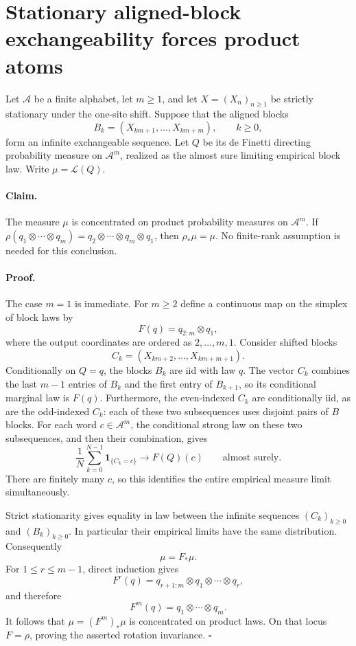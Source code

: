 \section*{Stationary aligned-block exchangeability forces product atoms}

Let $\mathcal A$ be a finite alphabet, let $m\geq 1$, and let
$X=(X_n)_{n\geq 1}$ be strictly stationary under the one-site shift.
Suppose that the aligned blocks
\[
 B_k=(X_{km+1},\ldots,X_{km+m}),\qquad k\geq0,
\]
form an infinite exchangeable sequence. Let $Q$ be its de Finetti directing
probability measure on $\mathcal A^m$, realized as the almost sure limiting
empirical block law. Write $\mu=\mathcal L(Q)$.

\paragraph{Claim.}
The measure $\mu$ is concentrated on product probability measures on
$\mathcal A^m$. If $\rho(q_1\otimes\cdots\otimes q_m)
=q_2\otimes\cdots\otimes q_m\otimes q_1$, then
$\rho_*\mu=\mu$. No finite-rank assumption is needed for this conclusion.

\paragraph{Proof.}
The case $m=1$ is immediate. For $m\geq2$ define a continuous map on the
simplex of block laws by
\[
 F(q)=q_{2:m}\otimes q_1,
\]
where the output coordinates are ordered as $2,\ldots,m,1$.
Consider shifted blocks
\[
 C_k=(X_{km+2},\ldots,X_{km+m+1}).
\]
Conditionally on $Q=q$, the blocks $B_k$ are iid with law $q$.
The vector $C_k$ combines the last $m-1$ entries of $B_k$ and the first
entry of $B_{k+1}$, so its conditional marginal law is $F(q)$.
Furthermore, the even-indexed $C_k$ are conditionally iid, as are the
odd-indexed $C_k$: each of these two subsequences uses disjoint pairs of
$B$ blocks. For each word $c\in\mathcal A^m$, the conditional strong law
on these two subsequences, and then their combination, gives
\[
 \frac1N\sum_{k=0}^{N-1}\mathbf1_{\{C_k=c\}}
 \longrightarrow F(Q)(c)\qquad\text{almost surely}.
\]
There are finitely many $c$, so this identifies the entire empirical
measure limit simultaneously.

Strict stationarity gives equality in law between the infinite sequences
$(C_k)_{k\geq0}$ and $(B_k)_{k\geq0}$. In particular their empirical limits
have the same distribution. Consequently
\[
 \mu=F_*\mu.
\]
For $1\leq r\leq m-1$, direct induction gives
\[
 F^r(q)=q_{r+1:m}\otimes q_1\otimes\cdots\otimes q_r,
\]
and therefore
\[
 F^m(q)=q_1\otimes\cdots\otimes q_m.
\]
It follows that $\mu=(F^m)_*\mu$ is concentrated on product laws.
On that locus $F=\rho$, proving the asserted rotation invariance.
\hfill$\square$

